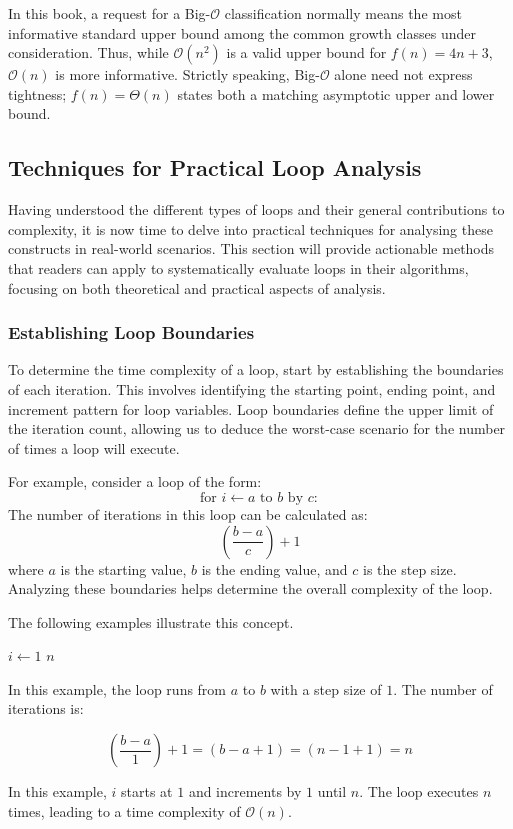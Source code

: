 In this book, a request for a Big-$\mathcal{O}$ classification normally means the most informative standard upper bound among the common growth classes under consideration. Thus, while $\mathcal{O}(n^2)$ is a valid upper bound for $f(n)=4n+3$, $\mathcal{O}(n)$ is more informative. Strictly speaking, Big-$\mathcal{O}$ alone need not express tightness; $f(n)=\Theta(n)$ states both a matching asymptotic upper and lower bound.

\subsection*{Techniques for Practical Loop Analysis}

Having understood the different types of loops and their general contributions to complexity, it is now time to delve into practical techniques for analysing these constructs in real-world scenarios. This section will provide actionable methods that readers can apply to systematically evaluate loops in their algorithms, focusing on both theoretical and practical aspects of analysis.

\subsubsection*{Establishing Loop Boundaries}
To determine the time complexity of a loop, start by establishing the boundaries of each iteration. This involves identifying the starting point, ending point, and increment pattern for loop variables. Loop boundaries define the upper limit of the iteration count, allowing us to deduce the worst-case scenario for the number of times a loop will execute.

For example, consider a loop of the form:
\[ 
\text{for } i \gets a \text{ to } b \text{ by } c:
\]
The number of iterations in this loop can be calculated as:
\[
\left(\frac{b - a}{c}\right) + 1
\]
where $a$ is the starting value, $b$ is the ending value, and $c$ is the step size. Analyzing these boundaries helps determine the overall complexity of the loop.

The following examples illustrate this concept.

\begin{example}

    \begin{codebox}
        \li \For $i \gets 1$ \To $n$ \Do
        \li     {}
            \End
    \end{codebox}

In this example, the loop runs from $a$ to $b$ with a step size of $1$. The number of iterations is:

\[
\left( \frac{b - a}{1} \right) + 1 = (b - a + 1) = (n - 1 + 1) = n 
\]

In this example, $i$ starts at $1$ and increments by $1$ until $n$. The loop executes $n$ times, leading to a time complexity of $\mathcal{O}(n)$.

\end{example}

